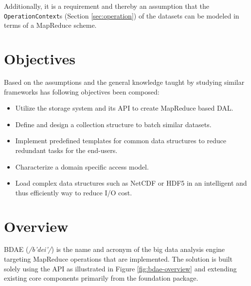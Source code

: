 Additionally, it is a requirement and thereby an assumption that the \texttt{OperationContext}s (Section \ref{sec:operation}) of the datasets can be modeled in terms of a MapReduce scheme.

\section{Objectives} \label{sec:bdae-objectives}
Based on the assumptions and the general knowledge taught by studying similar frameworks has following objectives been composed:
\begin{itemize}
	\item Utilize the \CodeName storage system and its API to create MapReduce based DAL.
	\item Define and design a collection structure to batch similar datasets.
	\item Implement predefined templates for common data structures to reduce redundant tasks for the end-users.
	\item Characterize a domain specific access model.
	\item Load complex data structures such as NetCDF\cite{PageNetCDF} or HDF5\cite{PageHDF5}\cite{Collette:2013:Python} in an intelligent and thus efficiently way to reduce I/O cost.
\end{itemize}

\section{Overview}
BDAE (\textit{/b'dei'/}) is the name and acronym of the big data analysis engine targeting MapReduce operations that are implemented. The solution is built solely using the \CodeName API as illustrated in Figure \ref{fig:bdae-overview} and extending existing core components primarily from the foundation package.

